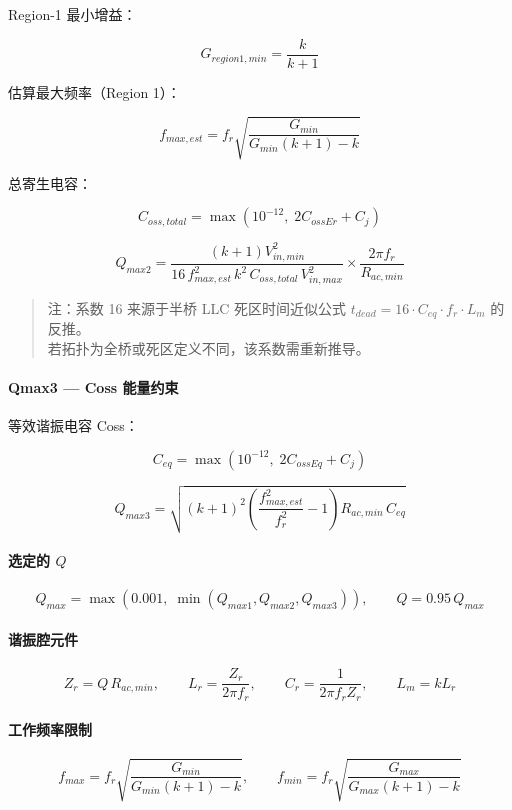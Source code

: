 \documentclass[UTF8]{ctexart}
\begin{document}
Region-1 最小增益：

\[
G_{region1,min} = \frac{k}{k+1}
\]

估算最大频率（Region 1）：

\[
f_{max,est} = f_r \sqrt{\frac{G_{min}}{G_{min}(k+1) - k}}
\]

总寄生电容：

\[
C_{oss,total} = \max\left(10^{-12},\; 2C_{ossEr} + C_j\right)
\]

\[
Q_{max2} =
\frac{(k+1)V_{in,min}^{2}}{16\,f_{max,est}^{2}\,k^{2}\,C_{oss,total}\,V_{in,max}^{2}}
\times \frac{2\pi f_r}{R_{ac,min}}
\]

\begin{quote}
注：系数 16 来源于半桥 LLC 死区时间近似公式 \( t_{dead} = 16 \cdot C_{eq} \cdot f_r \cdot L_m \) 的反推。\\
若拓扑为全桥或死区定义不同，该系数需重新推导。
\end{quote}

\paragraph{Qmax3 — Coss 能量约束}

等效谐振电容 Coss：

\[
C_{eq} = \max\left(10^{-12},\; 2C_{ossEq} + C_j\right)
\]

\[
Q_{max3} = \sqrt{(k+1)^{2}\left(\frac{f_{max,est}^{2}}{f_r^{2}} - 1\right) R_{ac,min}\,C_{eq}}
\]

\paragraph{选定的 \(Q\)}

\[
Q_{max} = \max\left(0.001,\; \min(Q_{max1}, Q_{max2}, Q_{max3})\right),\qquad
Q = 0.95 \, Q_{max}
\]

\paragraph{谐振腔元件}

\[
Z_r = Q \, R_{ac,min},\qquad
L_r = \frac{Z_r}{2\pi f_r},\qquad
C_r = \frac{1}{2\pi f_r Z_r},\qquad
L_m = k L_r
\]

\paragraph{工作频率限制}

\[
f_{max} = f_r \sqrt{\frac{G_{min}}{G_{min}(k+1) - k}},\qquad
f_{min} = f_r \sqrt{\frac{G_{max}}{G_{max}(k+1) - k}}
\]
\end{document}
